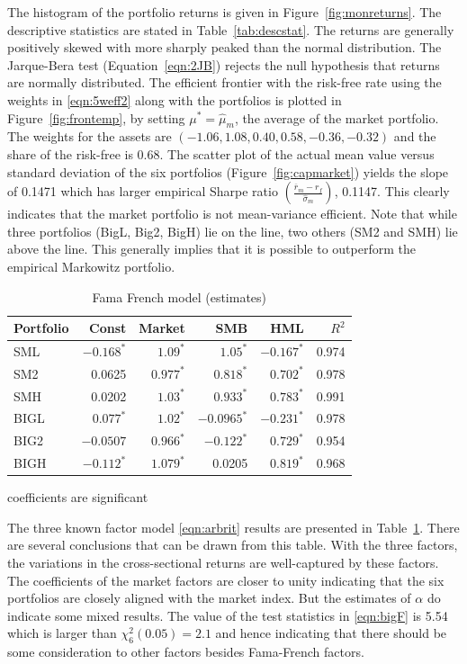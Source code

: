 The histogram of the portfolio returns is given in Figure~\ref{fig:monreturns}. The descriptive statistics are stated in Table~\ref{tab:descstat}. The returns are generally positively skewed with more sharply peaked than the normal distribution. The Jarque-Bera test (Equation~\ref{eqn:2JB}) rejects the null hypothesis that returns are normally distributed. The efficient frontier with the risk-free rate using the weights in \eqref{eqn:5weff2} along with the portfolios is plotted in Figure~\ref{fig:frontemp}, by setting $\mu^*= \hat{\mu}_m$, the average of the market portfolio. The weights for the assets are $(-1.06, 1.08, 0.40, 0.58, -0.36, -0.32)$ and the share of the risk-free is 0.68. The scatter plot of the actual mean value versus standard deviation of the six portfolios (Figure~\ref{fig:capmarket}) yields the slope of 0.1471 which has larger empirical Sharpe ratio $\left( \frac{\overline{r}_m - r_f}{\hat{\sigma}_m} \right)$, 0.1147. This clearly indicates that the market portfolio is not mean-variance efficient. Note that while three portfolios (BigL, Big2, BigH) lie on the line, two others (SM2 and SMH) lie above the line. This generally implies that it is possible to outperform the empirical Markowitz portfolio. 

        \begin{table}
        \centering
        \caption{Fama French model (estimates)\label{tab:famafrenchmodel}}
        \begin{tabular}{lrrrrr}
        Portfolio & Const & Market & SMB & HML & $R^2$ \\ \hline
        SML & $-0.168^*$ & $1.09^*$ & $1.05^*$ & $-0.167^*$ & 0.974 \\
        SM2 & 0.0625 & $0.977^*$ & $0.818^*$ & $0.702^*$ & 0.978 \\
        SMH & 0.0202 & $1.03^*$ & $0.933^*$ & $0.783^*$ & 0.991 \\
        BIGL & $0.077^*$ & $1.02^*$ & $-0.0965^*$ & $-0.231^*$ & 0.978 \\
        BIG2 & $-0.0507$ & $0.966^*$ & $-0.122^*$ & $0.729^*$ & 0.954 \\
        BIGH & $-0.112^*$ & $1.079^*$ & 0.0205 & $0.819^*$ & 0.968
        \end{tabular}
        {\small*coefficients are significant}
        \end{table}


The three known factor model \eqref{eqn:arbrit} results are presented in Table~\ref{tab:famafrenchmodel}. There are several conclusions that can be drawn from this table. With the three factors, the variations in the cross-sectional returns are well-captured by these factors. The coefficients of the market factors are closer to unity indicating that the six portfolios are closely aligned with the market index. But the estimates of $\alpha$ do indicate some mixed results. The value of the test statistics in \eqref{eqn:bigF} is 5.54 which is larger than $\chi_6^2 (0.05)= 2.1$ and hence indicating that there should be some consideration to other factors besides Fama-French factors.


